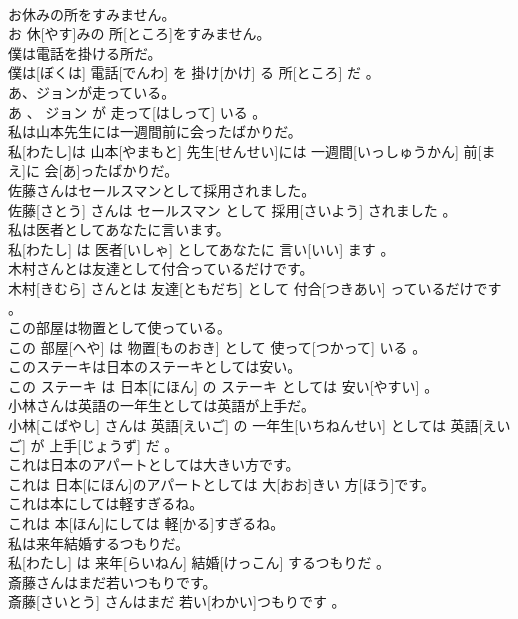 \documentclass[8pt]{extreport}
\begin{document}
\begin{CJK}{UTF8}{min}
\\	お休みの所をすみません。	
\\	お 休[やす]みの 所[ところ]をすみません。
\\	僕は電話を掛ける所だ。	
\\	僕は[ぼくは] 電話[でんわ] を 掛け[かけ] る 所[ところ] だ 。
\\	あ、ジョンが走っている。	
\\	あ 、 ジョン が 走って[はしって] いる 。
\\	私は山本先生には一週間前に会ったばかりだ。	
\\	私[わたし]は 山本[やまもと] 先生[せんせい]には 一週間[いっしゅうかん] 前[まえ]に 会[あ]ったばかりだ。
\\	佐藤さんはセールスマンとして採用されました。	
\\	佐藤[さとう] さんは セールスマン として 採用[さいよう] されました 。
\\	私は医者としてあなたに言います。	
\\	私[わたし] は 医者[いしゃ] としてあなたに 言い[いい] ます 。
\\	木村さんとは友達として付合っているだけです。	
\\	木村[きむら] さんとは 友達[ともだち] として 付合[つきあい] っているだけです 。
\\	この部屋は物置として使っている。	
\\	この 部屋[へや] は 物置[ものおき] として 使って[つかって] いる 。
\\	このステーキは日本のステーキとしては安い。	
\\	この ステーキ は 日本[にほん] の ステーキ としては 安い[やすい] 。
\\	小林さんは英語の一年生としては英語が上手だ。	
\\	小林[こばやし] さんは 英語[えいご] の 一年生[いちねんせい] としては 英語[えいご] が 上手[じょうず] だ 。
\\	これは日本のアパートとしては大きい方です。	
\\	これは 日本[にほん]のアパートとしては 大[おお]きい 方[ほう]です。
\\	これは本にしては軽すぎるね。	
\\	これは 本[ほん]にしては 軽[かる]すぎるね。
\\	私は来年結婚するつもりだ。	
\\	私[わたし] は 来年[らいねん] 結婚[けっこん] するつもりだ 。
\\	斎藤さんはまだ若いつもりです。	
\\	斎藤[さいとう] さんはまだ 若い[わかい]つもりです 。

\end{CJK}
\end{document}
